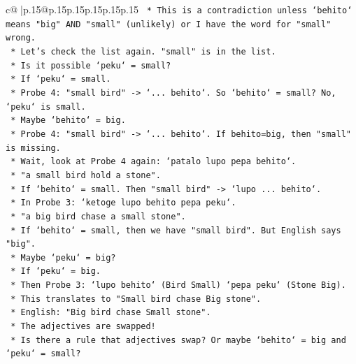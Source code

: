 \documentclass{article}
\begin{document}
{\begin{supertabular}{c@{$\;$}|p{.15\linewidth}@{}p{.15\linewidth}p{.15\linewidth}p{.15\linewidth}p{.15\linewidth}p{.15\linewidth}}
{{{\texttt{                        *   This is a contradiction unless `behito` means "big" AND "small" (unlikely) or I have the word for "small" wrong.} \\
\texttt{                        *   Let's check the list again. "small" is in the list.} \\
\texttt{                        *   Is it possible `peku` = small?} \\
\texttt{                        *   If `peku` = small.} \\
\texttt{                        *   Probe 4: "small bird" {-}> `... behito`. So `behito` = small? No, `peku` is small.} \\
\texttt{                        *   Maybe `behito` = big.} \\
\texttt{                        *   Probe 4: "small bird" {-}> `... behito`. If behito=big, then "small" is missing.} \\
\texttt{                        *   Wait, look at Probe 4 again: `patalo lupo pepa behito`.} \\
\texttt{                        *   "a small bird hold a stone".} \\
\texttt{                        *   If `behito` = small. Then "small bird" {-}> `lupo ... behito`.} \\
\texttt{                        *   In Probe 3: `ketoge lupo behito pepa peku`.} \\
\texttt{                        *   "a big bird chase a small stone".} \\
\texttt{                        *   If `behito` = small, then we have "small bird". But English says "big".} \\
\texttt{                        *   Maybe `peku` = big?} \\
\texttt{                        *   If `peku` = big.} \\
\texttt{                        *   Then Probe 3: `lupo behito` (Bird Small) `pepa peku` (Stone Big).} \\
\texttt{                        *   This translates to "Small bird chase Big stone".} \\
\texttt{                        *   English: "Big bird chase Small stone".} \\
\texttt{                        *   The adjectives are swapped!} \\
\texttt{                        *   Is there a rule that adjectives swap? Or maybe `behito` = big and `peku` = small?} \\
}}}
\end{supertabular}}
\end{document}

